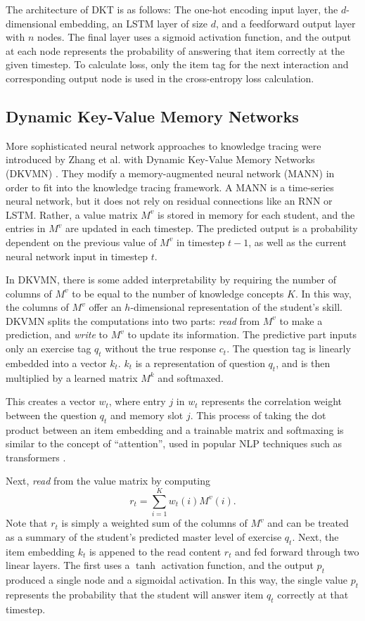   The architecture of DKT is as follows: The one-hot encoding input layer, the $d$-dimensional embedding, an LSTM layer of size $d$, and a feedforward output layer with $n$ nodes. The final layer uses a sigmoid activation function, and the output at each node represents the probability of answering that item correctly at the given timestep. To calculate loss, only the item tag for the next interaction and corresponding output node is used in the cross-entropy loss calculation.

\subsection{Dynamic Key-Value Memory Networks}
More sophisticated neural network approaches to knowledge tracing were introduced by Zhang et al. with Dynamic Key-Value Memory Networks (DKVMN) \cite{zhang2017}. They modify a memory-augmented neural network (MANN) in order to fit into the knowledge tracing framework. A MANN is a time-series neural network, but it does not rely on residual connections like an RNN or LSTM. Rather, a value matrix $M^v$ is stored in memory for each student, and the entries in $M^v$ are updated in each timestep. The predicted output is a probability dependent on the previous value of $M^v$ in timestep $t-1$, as well as the current neural network input in timestep $t$.

In DKVMN, there is some added interpretability by requiring the number of columns of $M^v$ to be equal to the number of knowledge concepts $K$. In this way, the columns of $M^v$ offer an $h$-dimensional representation of the student's skill. DKVMN splits the computations into two parts: \textit{read} from $M^v$ to make a prediction, and \textit{write} to $M^v$ to update its information. The predictive part inputs only an exercise tag $q_t$ without the true response $c_t$. The question tag is linearly embedded into a vector $k_t$. $k_t$ is a representation of question $q_t$, and is then multiplied by a learned matrix $M^k$ and softmaxed. 

This creates a vector $w_t$, where entry $j$ in $w_t$ represents the correlation weight between the question $q_t$ and memory slot $j$. This process of taking the dot product between an item embedding and a trainable matrix and softmaxing is similar to the concept of ``attention'', used in popular NLP techniques such as transformers \cite{vaswani2017}.

Next, \textit{read} from the value matrix by computing 
\begin{equation}
  r_t = \sum_{i=1}^K w_t(i) M^v(i).
  \label{eq:dkvmn_read}
\end{equation}
Note that $r_t$ is simply a weighted sum of the columns of $M^v$ and can be treated as a summary of the student's predicted master level of exercise $q_t$. Next, the item embedding $k_t$ is appened to the read content $r_t$ and fed forward through two linear layers. The first uses a $\tanh$ activation function, and the output $p_t$ produced a single node and a sigmoidal activation. In this way, the single value $p_t$ represents the probability that the student will answer item $q_t$ correctly at that timestep.

